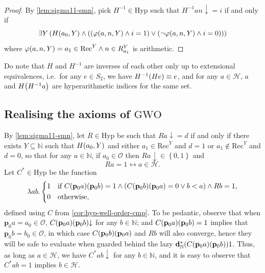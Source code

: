 \documentclass[12pt,openany]{book}
\theoremstyle{plain}
\theoremstyle{definition}
\newcommand\opE[1]{\mathop{\exists #1}}
\newcommand\oplam[1]{\mathop{\lambda #1.}}
\newcommand\GWO{\mathrm{GWO}}
\newcommand\Hyp{\mathrm{Hyp}}
\newcommand\bp{\mathbf{p}}
\newcommand\bdN{\mathbf{d}_\mathbb{N}}
\newcommand\Rec{\mathrm{Rec}}
\begin{document}
\begin{proof}
  By \autoref{lem:sigma11-smn}, pick $H^{-1} \in \Hyp$ such that $H^{-1} an {\downarrow} = i$ if and only if
  \[\opE{Y} \left(H\mleft(a_0, Y\mright) \land \left(\left(\varphi\mleft(a, n, Y\mright) \land i = 1\right) \lor \left(\neg \varphi\mleft(a, n, Y\mright) \land i = 0\right)\right)\right)\]
  where $\varphi\mleft(a, n, Y\mright) = a_1 \in \Rec^Y \land n \in R^Y_{a_1}$ is arithmetic.
\end{proof}

Do note that $H$ and $H^{-1}$ are inverses of each other only up to extensional equivalences, i.e.\ for any $e \in S_2$, we have $H^{-1} \mleft(He\mright) \equiv e$, and for any $a \in \mathcal{H}$, $a$ and $H \mleft(H^{-1} a\mright)$ are hyperarithmetic indices for the same set.

\subsection*{Realising the axioms of $\GWO$}

By \autoref{lem:sigma11-smn}, let $R \in \Hyp$ be such that $Ra {\downarrow} = d$ if and only if there exists $Y \subseteq \mathbb{N}$ such that $H\mleft(a_0, Y\mright)$ and either $a_1 \in \Rec^Y$ and $d = 1$ or $a_1 \not\in \Rec^Y$ and $d = 0$, so that for any $a \in \mathbb{N}$, if $a_0 \in \mathcal{O}$ then $Ra {\downarrow} \in \left\{0, 1\right\}$ and
\[Ra = 1 \leftrightarrow a \in \mathcal{H}.\]
Let $C^* \in \Hyp$ be the function
\[\oplam{ab} \left\{\begin{aligned}
     & 1 &  & \text{if $C \mleft(\bp_0 a\mright) \mleft(\bp_0 b\mright) = 1 \land \left(C \mleft(\bp_0 b\mright) \mleft(\bp_0 a\mright) = 0 \lor b < a\right)$} \land Rb = 1, \\
     & 0 &  & \text{otherwise},
  \end{aligned}\right.\]
defined using $C$ from \autoref{cor:hyp-well-order-cmp}. To be pedantic, observe that when $\bp_0 a = a_0 \in \mathcal{O}$, $C \mleft(\bp_0 a\mright) \mleft(\bp_0 b\mright) {\downarrow}$ for any $b \in \mathbb{N}$; and $C \mleft(\bp_0 a\mright) \mleft(\bp_0 b\mright) = 1$ implies that $\bp_0 b = b_0 \in \mathcal{O}$, in which case $C \mleft(\bp_0 b\mright) \mleft(\bp_0 a\mright)$ and $Rb$ will also converge, hence they will be safe to evaluate when guarded behind the lazy $\bdN^* \mleft(C \mleft(\bp_0 a\mright) \mleft(\bp_0 b\mright)\mright) 1$. Thus, as long as $a \in \mathcal{H}$, we have $C^* ab {\downarrow}$ for any $b \in \mathbb{N}$, and it is easy to observe that $C^* ab = 1$ implies $b \in \mathcal{H}$.
\end{document}
